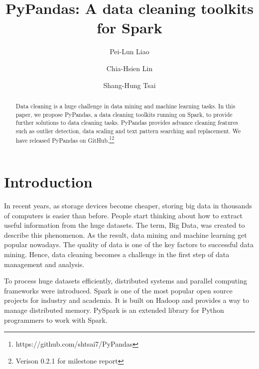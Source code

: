 \documentclass[sigconf]{acmart}
\begin{document}
\title{PyPandas: A data cleaning toolkits for Spark}

\author{Pei-Lun Liao}

\author{Chia-Hsien Lin}

\author{Shang-Hung Tsai}

\begin{abstract}
Data cleaning is a huge challenge in data mining and machine learning tasks. In this paper, we propose PyPandas, a data cleaning toolkits running on Spark, to provide further solutions to data cleaning tasks. PyPandas provides advance cleaning features such as outlier detection, data scaling and text pattern searching and replacement. We have released PyPandas on GitHub.\footnote{https://github.com/shtsai7/PyPandas}\footnote{Verison 0.2.1 for milestone report}
\end{abstract}

\maketitle

\section{Introduction}
In recent years, as storage devices become cheaper, storing big data in thousands of computers is easier than before. People start thinking about how to extract useful information from the huge datasets. The term, Big Data, was created to describe this phenomenon\cite{bigdata}. As the result, data mining\cite{Han, MMD} and machine learning\cite{ml} get popular nowadays. The quality of data is one of the key factors to successful data mining\cite{dataquality}. Hence, data cleaning becomes a challenge in the first step of data management and analysis\cite{datacleaning, DBS-045, PW}.
	
To process huge datasets efficiently, distributed systems and parallel computing frameworks\cite{mapreduce, gfs, hadoop} were introduced. Spark\cite{spark} is one of the most popular open source projects for industry and academia. It is built on Hadoop\cite{hadoop} and provides a way to manage distributed memory. PySpark\cite{pyspark} is an extended library for Python programmers to work with Spark.
	
\end{document}
